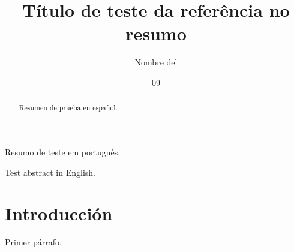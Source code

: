 \documentclass[dsc,spanish]{ufrj}
\title{Título de teste da referência no resumo}
\author{Nombre del}{Autor}
\date{09}{2026}
\begin{document}
  \maketitle
  \frontmatter
  \begin{brazilianabstract}
    Resumo de teste em português.
  \end{brazilianabstract}
  \begin{foreignabstract}
    Test abstract in English.
  \end{foreignabstract}
  \begin{abstract}
    Resumen de prueba en español.
  \end{abstract}
  \tableofcontents
  \mainmatter
  \chapter{Introducción}
    Primer párrafo.
\end{document}
